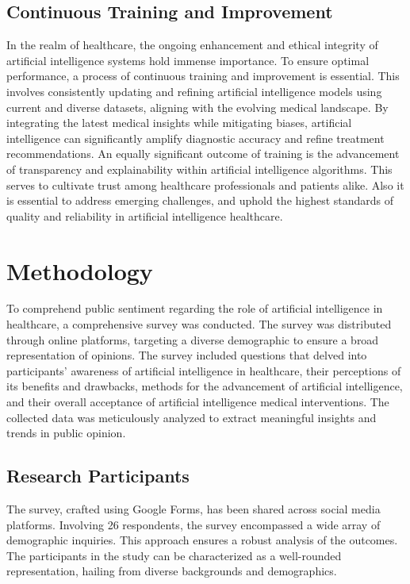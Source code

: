 \documentclass{ieeeaccess}
\begin{document}
\subsection{Continuous Training and Improvement}
In the realm of healthcare, the ongoing enhancement and ethical integrity of artificial intelligence systems hold immense importance. To ensure optimal performance, a process of continuous training and improvement is essential. This involves consistently updating and refining artificial intelligence models using current and diverse datasets, aligning with the evolving medical landscape. By integrating the latest medical insights while mitigating biases, artificial intelligence can significantly amplify diagnostic accuracy and refine treatment recommendations. An equally significant outcome of training is the advancement of transparency and explainability within artificial intelligence algorithms. This serves to cultivate trust among healthcare professionals and patients alike. Also it is essential to address emerging challenges, and uphold the highest standards of quality and reliability in artificial intelligence healthcare.


\section{Methodology}
To comprehend public sentiment regarding the role of artificial intelligence in healthcare, a comprehensive survey was conducted. The survey was distributed through online platforms, targeting a diverse demographic to ensure a broad representation of opinions. The survey included questions that delved into participants' awareness of artificial intelligence in healthcare, their perceptions of its benefits and drawbacks, methods for the advancement of artificial intelligence, and their overall acceptance of artificial intelligence medical interventions. The collected data was meticulously analyzed to extract meaningful insights and trends in public opinion.

\subsection{Research Participants}
The survey, crafted using Google Forms, has been shared across social media platforms. Involving 26 respondents, the survey encompassed a wide array of demographic inquiries. This approach ensures a robust analysis of the outcomes. The participants in the study can be characterized as a well-rounded representation, hailing from diverse backgrounds and demographics.
\end{document}
